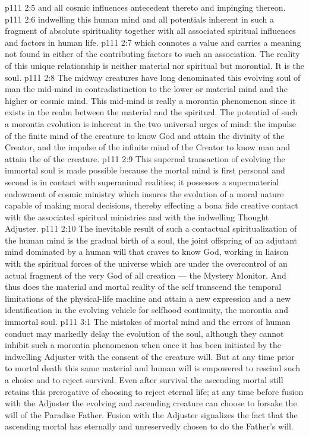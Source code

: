 \vs p111 2:5 \bibnobreakspace {} and all cosmic influences antecedent thereto and impinging thereon.
\vs p111 2:6 \pc {}\bibnobreakspace {} indwelling this human mind and all potentials inherent in such a fragment of absolute spirituality together with all associated spiritual influences and factors in human life.
\vs p111 2:7 \pc {}\bibnobreakspace {} which connotes a value and carries a meaning not found in either of the contributing factors to such an association. The reality of this unique relationship is neither material nor spiritual but morontial. It is the soul.
\vs p111 2:8 \pc The midway creatures have long denominated this evolving soul of man the mid\hyp{}mind in contradistinction to the lower or material mind and the higher or cosmic mind. This mid\hyp{}mind is really a morontia phenomenon since it exists in the realm between the material and the spiritual. The potential of such a morontia evolution is inherent in the two universal urges of mind: the impulse of the finite mind of the creature to know God and attain the divinity of the Creator, and the impulse of the infinite mind of the Creator to know man and attain the  of the creature.
\vs p111 2:9 This supernal transaction of evolving the immortal soul is made possible because the mortal mind is first personal and second is in contact with superanimal realities; it possesses a supermaterial endowment of cosmic ministry which insures the evolution of a moral nature capable of making moral decisions, thereby effecting a bona fide creative contact with the associated spiritual ministries and with the indwelling Thought Adjuster.
\vs p111 2:10 The inevitable result of such a contactual spiritualization of the human mind is the gradual birth of a soul, the joint offspring of an adjutant mind dominated by a human will that craves to know God, working in liaison with the spiritual forces of the universe which are under the overcontrol of an actual fragment of the very God of all creation --- the Mystery Monitor. And thus does the material and mortal reality of the self transcend the temporal limitations of the physical\hyp{}life machine and attain a new expression and a new identification in the evolving vehicle for selfhood continuity, the morontia and immortal soul.
\vs p111 3:1 The mistakes of mortal mind and the errors of human conduct may markedly delay the evolution of the soul, although they cannot inhibit such a morontia phenomenon when once it has been initiated by the indwelling Adjuster with the consent of the creature will. But at any time prior to mortal death this same material and human will is empowered to rescind such a choice and to reject survival. Even after survival the ascending mortal still retains this prerogative of choosing to reject eternal life; at any time before fusion with the Adjuster the evolving and ascending creature can choose to forsake the will of the Paradise Father. Fusion with the Adjuster signalizes the fact that the ascending mortal has eternally and unreservedly chosen to do the Father’s will.
